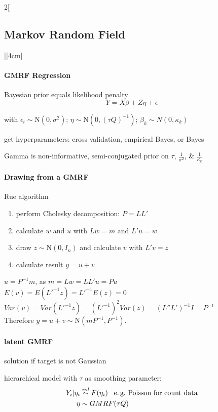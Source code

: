 \documentclass[8pt]{extarticle}
\begin{document}
\begin{multicols}{2}[\subsection{Markov Random Field}][4cm]
\paragraph{GMRF Regression} Bayesian prior equals likelihood penalty 
$$Y = X \beta + Z \eta + \epsilon$$

with  $\epsilon_i \sim \mathrm{N}(0, \sigma^2)$; $\eta \sim \mathrm{N}(0, (\tau Q)^{-1})$; $\beta_k \sim N (0, \kappa_k )$

\noindent get hyperparameters: cross validation, empirical Bayes, or Bayes 

\noindent Gamma is non-informative, semi-conjugated prior on $\tau$, $\frac{1}{\sigma^2}$, \& $\frac{1}{\kappa_k}$ 




\paragraph{Drawing from a GMRF} Rue algorithm
\begin{enumerate}[itemsep=-0.5em]
\item perform Cholesky decomposition: $P=LL'$ 
\item calculate $w$ and $u$ with $Lw=m$ and $L'u=w$
\item draw $z\sim\mathrm{N}(0,I_n)$ and calculate $v$ with $L'v=z$
\item calculate result $y=u+v$
\end{enumerate}

\begin{Proof}
$u=P^{-1}m$, as $m=Lw=LL'u=Pu  $ \\
$E(v)=E(L'^{-1}z)=L'^{-1}E(z)=0$ \\
$Var(v)=Var(L'^{-1}z){=}(L'^{-1})^2 Var(z){=}(L''L')^{-1}I=P^{-1}$ \\
Therefore $y = u+v\sim \mathrm{N}(mP^{-1}, P^{-1})$.
\end{Proof}

\paragraph{latent GMRF} solution if target is not Gaussian

hierarchical model with $\tau$ as smoothing parameter:
\begin{align*}
Y_i | \eta_i &\overset{iid}{\sim} F(\eta_i) \,\,\, \text{ e.\,g.\@ Poisson for count data}\\
\eta &\sim GMRF(\tau Q)
\end{align*}


\end{multicols}
\end{document}

